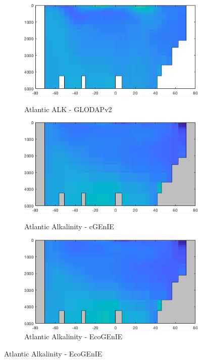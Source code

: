 \documentclass{article}
\begin{document}
\begin{figure}[htp]
 \centering
\begin{subfigure}{.33\textwidth}
 \caption{Atlantic ALK - GLODAPv2}
 \includegraphics[width=0.95\linewidth]{../Separate_figures/OBSERVATIONS/Atlantic_TALK_profile.png}
 \label{fig:nutrients1}
\end{subfigure}%
\begin{subfigure}{.33\textwidth}
 \caption{Atlantic Alkalinity - cGEnIE}
 \includegraphics[width=0.95\linewidth]{../Separate_figures/BIOGEM/Atlantic_ocn_ALK_profile.png}
 \label{fig:nutrients1}
\end{subfigure}%
\begin{subfigure}{.33\textwidth}
 \caption{Atlantic Alkalinity - EcoGEnIE}
 \includegraphics[width=0.95\linewidth]{../Separate_figures/ECOGEM/Atlantic_ocn_ALK_profile.png}

\end{subfigure}
\end{figure}
\end{document}
